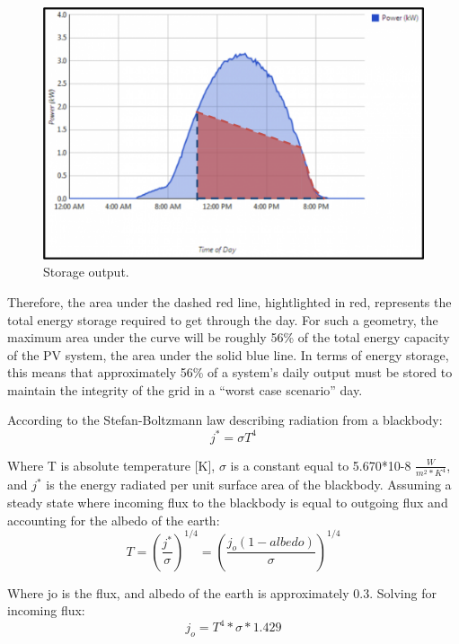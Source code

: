 \begin{figure}
\begin{center}
\includegraphics[scale=0.6]{pics/PatrickFigure2.png}
\caption{Storage output.}
\label{p2}
\end{center}
\end{figure}

Therefore, the area under the dashed red line, hightlighted in red, represents
the total energy storage required to get through the day. For such a geometry,
the maximum area under the curve will be roughly 56\% of the total energy
capacity of the PV system, the area under the solid blue line. In terms of
energy storage, this means that approximately 56\% of a system's daily output
must be stored to maintain the integrity of the grid in a ``worst case scenario''
day.

According to the Stefan-Boltzmann law describing radiation from a blackbody:
\begin{equation}
j^* = \sigma T^4
\end{equation}

Where T is absolute temperature [K], $\sigma$ is a constant equal to 5.670*10-8
$\frac{W}{m^2*K^4}$, and $j^*$ is the energy radiated per unit surface area of
the blackbody.
Assuming a steady state where incoming flux to the blackbody is equal to
outgoing flux and accounting for the albedo of the earth:
\begin{equation}
T={(\frac{j^*}{\sigma})}^{1/4}=(\frac{j_o(1-albedo)}{\sigma})^{1/4}
\end{equation}

Where jo is the flux, and albedo of the earth is approximately 0.3. Solving for
incoming flux:
\begin{equation}
j_o=T^4*\sigma*1.429
\end{equation}

